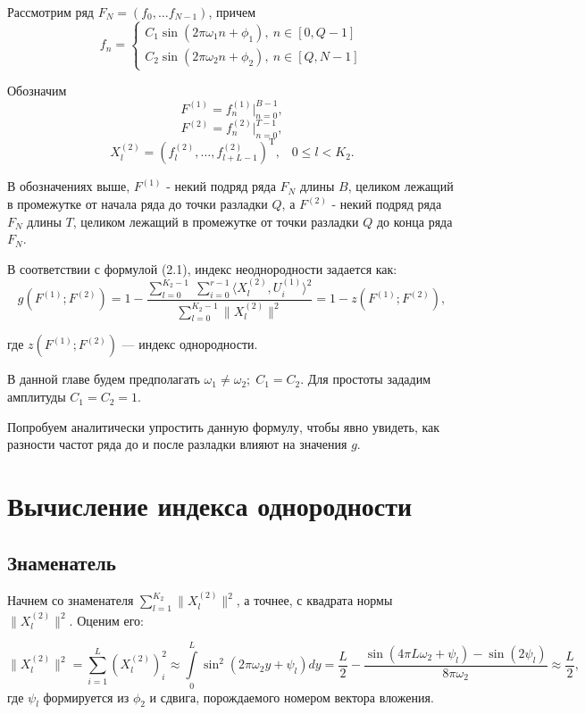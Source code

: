 \documentclass[specialist, substylefile = spbu.rtx,
			   subf, href, 12pt]{disser}
\begin{document}
Рассмотрим ряд $ F_N = (f_0, \dots f_{N-1}) $, причем  
\begin{equation*} 
	f_n = 
	\begin{cases} 
		C_1\sin(2\pi\omega_1 n + \phi_1),\ n \in [0, Q-1] \\ 
		C_2\sin(2\pi\omega_2 n + \phi_2),\ n \in [Q, N-1] 
	\end{cases} 
\end{equation*} 

Обозначим 
$$ F^{(1)} = f_n^{(1)}|_{n=0}^{B-1}, $$
$$ F^{(2)} = f_n^{(2)}|_{n=0}^{T-1}, $$
$$X_l^{(2)} = (f_{l}^{(2)}, \dotsc, f_{l+L-1}^{(2)})^\mathrm{T}, \;\;\; 0 \leq l < K_2.$$

В обозначениях выше, $ F^{(1)} $ - некий подряд ряда $ F_N $ длины $ B $, целиком лежащий в промежутке от начала ряда до точки разладки $ Q $, а  $ F^{(2)} $ - некий подряд ряда $ F_N $ длины $ T $, целиком лежащий в промежутке от точки разладки $ Q $ до конца ряда $ F_N $. 


В соответствии с формулой (2.1), индекс неоднородности задается как:
$$ g(F^{(1)}; F^{(2)}) = 1 - \frac{\sum\limits_{l=0}^{K_2-1}\;\sum\limits_{i=0}^{r-1}\langle X_l^{(2)}, U_i^{(1)}\rangle^2}{\sum\limits_{l=0}^{K_2-1}\|X_l^{(2)}\|^2} = 1 - z(F^{(1)}; F^{(2)}),  $$

где $ z(F^{(1)}; F^{(2)}) $ --- индекс однородности.

В данной главе будем предполагать $ \omega_1 \neq \omega_2;\; C_1 = C_2 $. Для простоты зададим амплитуды $ C_1 = C_2 = 1 $.

Попробуем аналитически упростить данную формулу, чтобы явно увидеть, как разности частот ряда до и после разладки влияют на значения $ g $.

\section{Вычисление индекса однородности}
\subsection{Знаменатель}
Начнем со знаменателя $\sum\limits_{l=1}^{K_2}\|X_l^{(2)}\|^2$, а точнее, с квадрата нормы $\|X_l^{(2)}\|^2$. Оценим его:

$$ \|X_l^{(2)}\|^2 = \sum\limits_{i=1}^{L}(X_{l}^{(2)})_i^2 \approx \int\limits_{0}^{L}\sin^2{(2\pi\omega_2 y + \psi_l)}dy = \frac{L}{2} - \frac{\sin(4\pi L\omega_2 + \psi_l) - \sin(2\psi_l)}{8\pi\omega_2} \approx \frac{L}{2}, $$
где $ \psi_l $ формируется из $ \phi_2 $ и сдвига, порождаемого номером вектора вложения.
\end{document}

